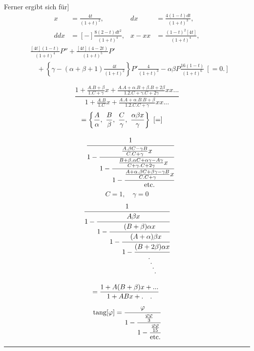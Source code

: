 \noindent Ferner ergibt sich für]
\[\begin{aligned}
x&=\frac{4t}{(1+t)^2},& dx&=\frac{4(1-t)dt}{(1+t)^3},\\[.7em]
ddx&=[-]\frac{8(2-t)dt^2}{(1+t)^4},& x-xx&=\frac{(1-t)^2[4t]}{(1+t)^4},
\end{aligned}\]
\[\begin{aligned}
&\frac{[4t](1-t)}{(1+t)^4}P''+\frac{[4t](4-2t)}{(1+t)^5}P'\\[.6em]
&\quad+\left\{\gamma-(\alpha+\beta+1)\frac{4t}{(1+t)^2}\right\}P'\frac4{(1+t)^3}
-\alpha\beta P\frac{16(1-t)}{(1+t)^6}\ [=0.]
\end{aligned}\]
\clearpage{}
\noindent{\small[S. 235]}\par
\[\frac{1+\frac{A{.}B+\beta}{1{.}C+\gamma}x+\frac{A{.}A+\alpha{.}B+\beta{.}B+2\beta}{1{.}2{.}C+\gamma{.}C+2\gamma}xx{.}{.}{.}}{1+\frac{A{.}B}{1{.}C}x+\frac{A{.}A+\alpha{.}B{.}B+\beta}{1{.}2{.}C{.}C+\gamma}xx{.}{.}{.}}\]
\[\begin{aligned}
&=\left\{\frac A\alpha,\ \frac B\beta,\ \frac C\gamma,\ \frac{\alpha\beta x}\gamma\right\}\ [=]\\[.8em]
&\quad\cfrac1{1-\cfrac{\frac{A{.}\beta C-\gamma B}{C{.}C+\gamma}x}{1-\cfrac{\frac{B+\beta{.}\alpha C+\alpha\gamma-A\gamma}{C+\gamma{.}C+2\gamma}x}{1-\cfrac{\frac{A+\alpha{.}\beta C+\beta\gamma-\gamma B}{C{.}C+\gamma}x}{\text{etc.}}}}}
\end{aligned}\]
\[C=1,\quad\gamma=0\]
\[\begin{aligned}
&\cfrac1{1-\cfrac{A\beta x}{1-\cfrac{(B+\beta)\alpha x}{1-\cfrac{(A+\alpha)\beta x}{1-\cfrac{(B+2\beta)\alpha x}{\begin{array}{@{}l@{}}{.}\\[-.5em]\kern.3em{.}\\[-.5em]\kern.6em{.}\\[-.5em]\kern.9em{.}\end{array}}}}}}\\[.8em]
&\quad=\frac{1+A(B+\beta)x+{.}{.}{.}}{1+ABx+{.}\quad{.}}
\end{aligned}\]
\[\operatorname{tang}[\varphi]=\cfrac\varphi{1-\cfrac{\frac{\varphi\varphi}3}{1-\cfrac{\frac{\varphi\varphi}{15}}{\text{etc.}}}}\]
\par{}\bigskip\noindent\rule{.25\linewidth}{.4pt}\par\smallskip
{\small\par{}\par}
\clearpage
\endgroup
